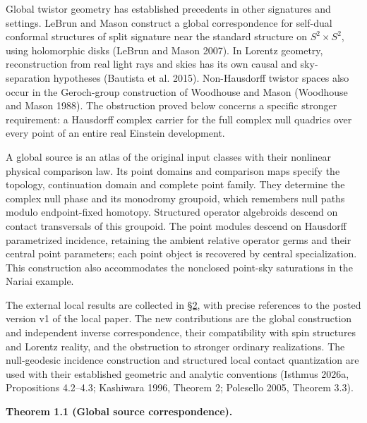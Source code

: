 \documentclass[
  english,
  11pt,
  reqno]{amsart}
\makeatletter
\newcommand{\pandocstatementheading}[1]{%
  \par\addpenalty{\@beginparpenalty}%
  \addvspace{.5\baselineskip plus .2\baselineskip minus .2\baselineskip}%
  {\normalfont\bfseries #1\par}%
  \nobreak\@afterindenttrue\@afterheading
}
\makeatother
\begin{document}
Global twistor geometry has established precedents in other signatures
and settings. LeBrun and Mason construct a global correspondence for
self-dual conformal structures of split signature near the standard
structure on \(S^2\times S^2\), using holomorphic disks (LeBrun and
Mason 2007). In Lorentz geometry, reconstruction from real light rays
and skies has its own causal and sky-separation hypotheses (Bautista et
al. 2015). Non-Hausdorff twistor spaces also occur in the Geroch-group
construction of Woodhouse and Mason (Woodhouse and Mason 1988). The
obstruction proved below concerns a specific stronger requirement: a
Hausdorff complex carrier for the full complex null quadrics over every
point of an entire real Einstein development.

A global source is an atlas of the original input classes with their
nonlinear physical comparison law. Its point domains and comparison maps
specify the topology, continuation domain and complete point family.
They determine the complex null phase and its monodromy groupoid, which
remembers null paths modulo endpoint-fixed homotopy. Structured operator
algebroids descend on contact transversals of this groupoid. The point
modules descend on Hausdorff parametrized incidence, retaining the
ambient relative operator germs and their central point parameters; each
point object is recovered by central specialization. This construction
also accommodates the nonclosed point-sky saturations in the Nariai
example.

The external local results are collected in
\hyperref[sec:local-input-v08]{§2}, with precise references to the
posted version v1 of the local paper. The new contributions are the
global construction and independent inverse correspondence, their
compatibility with spin structures and Lorentz reality, and the
obstruction to stronger ordinary realizations. The null-geodesic
incidence construction and structured local contact quantization are
used with their established geometric and analytic conventions (Isthmus
2026a, Propositions 4.2--4.3; Kashiwara 1996, Theorem 2; Polesello 2005,
Theorem 3.3).

\pandocstatementheading{\protect{}\label{thm:global-source-correspondence-v08}Theorem 1.1 (Global source correspondence).}
\end{document}
